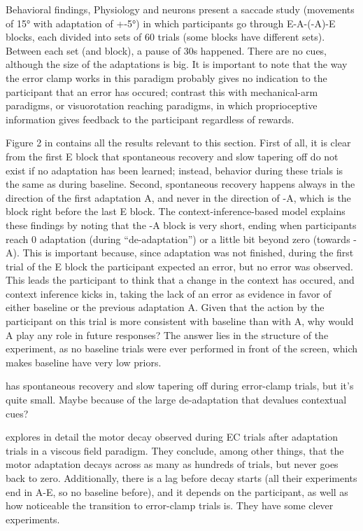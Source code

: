 \documentclass{report}
\begin{document}
\begin{chapter}{Behavioral findings, Physiology and neurons}
\cite{Ethier_Spontaneous_2008} present a saccade study (movements of 15° with
adaptation of +-5°) in which participants go through E-A-(-A)-E blocks, each
divided into sets of 60 trials (some blocks have different sets). Between each
set (and block), a pause of 30s happened. There are no cues, although the size
of the adaptations is big. It is important to note that the way the error clamp
works in this paradigm probably gives no indication to the participant that an
error has occured; contrast this with mechanical-arm paradigms, or
visuorotation reaching paradigms, in which proprioceptive information gives
feedback to the participant regardless of rewards.

Figure 2 in \cite{Ethier_Spontaneous_2008} contains all the results relevant to
this section. First of all, it is clear from the first E block that spontaneous
recovery and slow tapering off do not exist if no adaptation has been learned;
instead, behavior during these trials is the same as during baseline. Second,
spontaneous recovery happens always in the direction of the first adaptation A,
and never in the direction of -A, which is the block right before the last E
block. The context-inference-based model explains these findings by noting that
the -A block is very short, ending when participants reach 0 adaptation (during
``de-adaptation'') or a little bit beyond zero (towards -A). This is important
because, since adaptation was not finished, during the first trial of the E
block the participant expected an error, but no error was observed. This leads
the participant to think that a change in the context has occured, and context
inference kicks in, taking the lack of an error as evidence in favor of either
baseline or the previous adaptation A. Given that the action by the participant
on this trial is more consistent with baseline than with A, why would A play
any role in future responses? The answer lies in the structure of the
experiment, as no baseline trials were ever performed in front of the screen,
which makes baseline have very low priors.

\cite{Forano_Timescales_2020} has spontaneous recovery and slow tapering off
during error-clamp trials, but it's quite small. Maybe because of the large
de-adaptation that devalues contextual cues?

\cite{Vaswani_Decay_2013} explores in detail the motor decay observed during EC
trials after adaptation trials in a viscous field paradigm. They conclude,
among other things, that the motor adaptation decays across as many as hundreds
of trials, but never goes back to zero. Additionally, there is a lag before
decay starts (all their experiments end in A-E, so no baseline before), and it
depends on the participant, as well as how noticeable the transition to
error-clamp trials is. They have some clever experiments.


\end{chapter}
\end{document}
